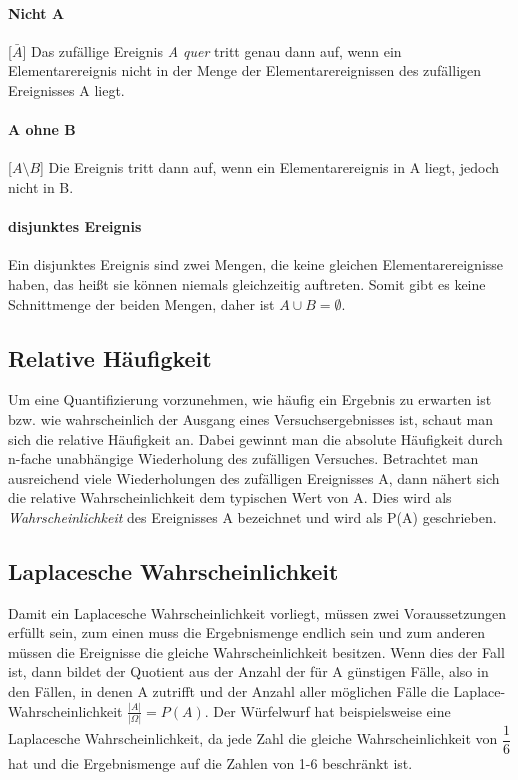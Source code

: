 \documentclass[a4paper]{article}
\begin{document}
\paragraph{Nicht A} [$\bar A$] Das zufällige Ereignis \textit{A quer} tritt genau dann auf, wenn ein Elementarereignis nicht in der Menge der Elementarereignissen des zufälligen Ereignisses A liegt.

\paragraph{A ohne B} [$A\setminus B$] Die Ereignis tritt dann auf, wenn ein Elementarereignis in A liegt, jedoch nicht in B.

\paragraph{disjunktes Ereignis} Ein disjunktes Ereignis sind zwei Mengen, die keine gleichen Elementarereignisse haben, das heißt sie können niemals gleichzeitig auftreten. Somit gibt es keine Schnittmenge der beiden Mengen, daher ist $A\cup B=\emptyset$.


\subsection{Relative Häufigkeit}
Um eine Quantifizierung vorzunehmen, wie häufig ein Ergebnis zu erwarten ist bzw. wie wahrscheinlich der Ausgang eines Versuchsergebnisses ist, schaut man sich die relative Häufigkeit an. Dabei gewinnt man die absolute Häufigkeit durch n-fache unabhängige Wiederholung des zufälligen Versuches.
Betrachtet man ausreichend viele Wiederholungen des zufälligen Ereignisses A, dann nähert sich die relative Wahrscheinlichkeit dem typischen Wert von A. Dies wird als \textit{Wahrscheinlichkeit} des Ereignisses A bezeichnet und wird als P(A) geschrieben.

\subsection{Laplacesche Wahrscheinlichkeit}
Damit ein Laplacesche Wahrscheinlichkeit vorliegt, müssen zwei Voraussetzungen erfüllt sein, zum einen muss die Ergebnismenge endlich sein und zum anderen müssen die Ereignisse die gleiche Wahrscheinlichkeit besitzen. Wenn dies der Fall ist, dann bildet der Quotient aus der Anzahl der für A günstigen Fälle, also in den Fällen, in denen A zutrifft und der Anzahl aller möglichen Fälle die Laplace-Wahrscheinlichkeit $\frac{|A|}{|\Omega|}=P(A)$.
Der Würfelwurf hat beispielsweise eine Laplacesche Wahrscheinlichkeit, da jede Zahl die gleiche Wahrscheinlichkeit von $\dfrac{1}{6}$ hat und die Ergebnismenge auf die Zahlen von 1-6 beschränkt ist.
\end{document}
